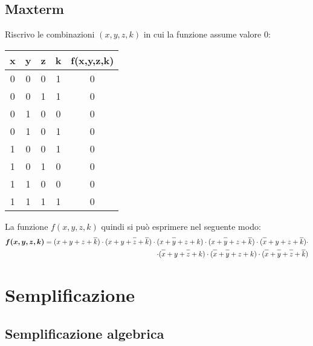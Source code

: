 \documentclass{article}
\newcommand*{\oline}[1]{\overline{#1\mathstrut}}
\begin{document}
\subsection*{Maxterm}
Riscrivo le combinazioni $(x,y,z,k)$ in cui la funzione assume valore $0$:
\begin{center}
  \begin{tabular}{|c|c|c|c|c|}
    \hline
    \textbf{x} & \textbf{y} & \textbf{z} & \textbf{k} & \textbf{f(x,y,z,k)} \\
    \hline
      0 & 0 & 0 & 1 & 0 \\
    \hline
      0 & 0 & 1 & 1 & 0 \\
    \hline
      0 & 1 & 0 & 0 & 0 \\
    \hline
      0 & 1 & 0 & 1 & 0 \\
    \hline
      1 & 0 & 0 & 1 & 0 \\
    \hline
      1 & 0 & 1 & 0 & 0 \\
    \hline
      1 & 1 & 0 & 0 & 0 \\
    \hline
      1 & 1 & 1 & 1 & 0 \\
    \hline
  \end{tabular}
\end{center}
La funzione $f(x,y,z,k)$ quindi si può esprimere nel seguente modo:
\begin{align*}
  \bm{f(x,y,z,k)} = (x+y+z+\oline{k}) \cdot (x+y+\oline{z}+\oline{k}) \cdot (x+\oline{y}+z+k) \cdot (x+\oline{y}+z+\oline{k}) \cdot (\oline{x}+y+z+\oline{k}) \cdot\\
  \cdot (\oline{x}+y+\oline{z}+k) \cdot (\oline{x}+\oline{y}+z+k) \cdot (\oline{x}+\oline{y}+\oline{z}+\oline{k})
\end{align*}

\section{Semplificazione}

\subsection*{Semplificazione algebrica}
\end{document}
